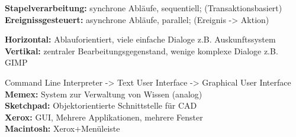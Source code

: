 \textbf{Stapelverarbeitung:} synchrone Abläufe, sequentiell; (Transaktionsbasiert) \\
\textbf{Ereignissgesteuert:} asynchrone Abläufe, parallel; (Ereignis -> Aktion) 

\textbf{Horizontal:} Ablauforientiert, viele einfache Dialoge z.B. Auskunftssystem\\
\textbf{Vertikal:} zentraler Bearbeitungsgegenstand, wenige komplexe Dialoge z.B. GIMP



Command Line Interpreter -> Text User Interface -> Graphical User Interface \\
\textbf{Memex:} System zur Verwaltung von Wissen (analog)\\
\textbf{Sketchpad:} Objektorientierte Schnittstelle für CAD\\
\textbf{Xerox:} GUI, Mehrere Applikationen, mehrere Fenster\\
\textbf{Macintosh:} Xerox+Menüleiste


